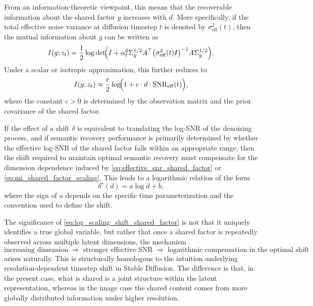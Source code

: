 From an information-theoretic viewpoint, this means that the recoverable information about the shared factor $g$ increases with $d$. More specifically, if the total effective noise variance at diffusion timestep $t$ is denoted by $\sigma_{\mathrm{eff}}^2(t)$, then the mutual information about $g$ can be written as
\begin{equation}
I(g;z_t)
=
\frac{1}{2}\log\det\!\Bigl(
I+\alpha_t^2\Sigma_g^{1/2}A^\top
\bigl(\sigma_{\mathrm{eff}}^2(t)I\bigr)^{-1}
A\Sigma_g^{1/2}
\Bigr).
\label{eq:mi_shared_factor_general}
\end{equation}
Under a scalar or isotropic approximation, this further reduces to
\begin{equation}
I(g;z_t)
\approx
\frac{r}{2}\log\!\Bigl(1+c\cdot d\cdot \mathrm{SNR}_{\mathrm{eff}}(t)\Bigr),
\label{eq:mi_shared_factor_scaling}
\end{equation}
where the constant $c>0$ is determined by the observation matrix and the prior covariance of the shared factor.

If the effect of a shift $\delta$ is equivalent to translating the log-SNR of the denoising process, and if semantic recovery performance is primarily determined by whether the effective log-SNR of the shared factor falls within an appropriate range, then the shift required to maintain optimal semantic recovery must compensate for the dimension dependence induced by \eqref{eq:effective_snr_shared_factor} or \eqref{eq:mi_shared_factor_scaling}. This leads to a logarithmic relation of the form
\begin{equation}
\delta^{\star}(d)=a\log d+b,
\label{eq:log_scaling_shift_shared_factor}
\end{equation}
where the sign of $a$ depends on the specific time parameterization and the convention used to define the shift.

\begin{remark}
\label{rem:resolution_shift_homology}
The significance of \eqref{eq:log_scaling_shift_shared_factor} is not that it uniquely identifies a true global variable, but rather that once a shared factor is repeatedly observed across multiple latent dimensions, the mechanism
\[
\text{increasing dimension} \;\Rightarrow\; \text{stronger effective SNR} \;\Rightarrow\; \text{logarithmic compensation in the optimal shift}
\]
arises naturally. This is structurally homologous to the intuition underlying resolution-dependent timestep shift in Stable Diffusion. The difference is that, in the present case, what is shared is a joint structure within the latent representation, whereas in the image case the shared content comes from more globally distributed information under higher resolution.
\end{remark}

